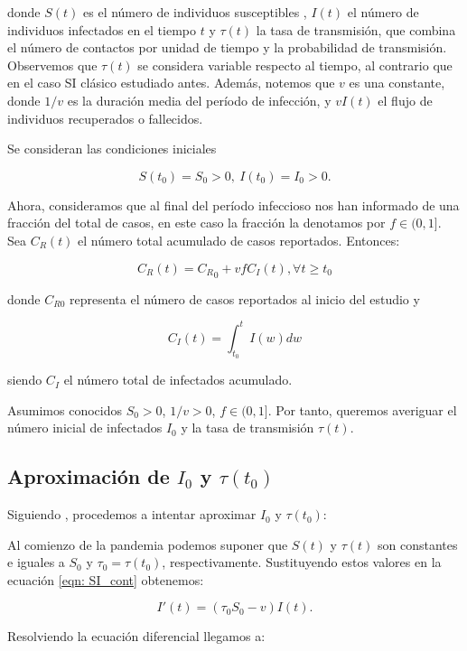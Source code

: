 donde $S(t)$ es el número de individuos susceptibles , $I(t)$ el número de individuos infectados en el tiempo $t$ y $\tau (t)$ la tasa de transmisión, que combina el número de contactos por unidad de tiempo y la probabilidad de transmisión. Observemos que $\tau (t)$ se considera variable respecto al tiempo, al contrario que en el caso SI clásico estudiado antes. Además, notemos que $v$ es una constante, donde $1/v$ es la duración media del período de infección, y $vI(t)$ el flujo de individuos recuperados o fallecidos. %

Se consideran las condiciones iniciales

$$S(t_0)=S_0>0, \: I(t_0)=I_0>0.$$

Ahora, consideramos que al final del período infeccioso nos han informado de una fracción del total de casos, en este caso la fracción la denotamos por $f\in (0,1]$. Sea $C_R(t)$ el número total acumulado de casos reportados. Entonces:

\begin{equation}
\label{eqn: acumulada}
C_R(t) = {C_R}_0 + vfC_I(t), \forall t \geq t_0
\end{equation}

donde $C_{R0}$ representa el número de casos reportados al inicio del estudio y 

$$C_I(t) = \int_{t_0}^t I(w) dw $$

siendo $C_I$ el número total de infectados acumulado.

Asumimos conocidos $S_0 > 0$, $1/v>0$, $f\in (0,1]$. Por tanto, queremos averiguar el número inicial de infectados $I_0$ y la tasa de transmisión $\tau (t)$.

\subsection{Aproximación de $I_0$ y $\tau (t_0)$}
Siguiendo \cite{demongeotSIEpidemicModel}, procedemos a intentar aproximar $I_0$ y $\tau (t_0)$:

Al comienzo de la pandemia podemos suponer que $S(t)$ y $\tau (t)$ son constantes e iguales a $S_0$ y $\tau_0 = \tau (t_0)$, respectivamente. Sustituyendo estos valores en la ecuación \eqref{eqn: SI_cont} obtenemos:

$$I'(t) = (\tau_0 S_0 -v) I(t).$$

Resolviendo la ecuación diferencial llegamos a:

